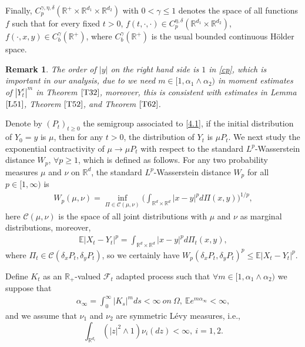 \documentclass[11pt,reqno]{amsart}
\newtheorem{remark}{\indent Remark}[section]
\numberwithin{equation}{section}
\begin{document}
Finally, $C^{\gamma, \eta, \delta}_p(\mathbb{R}^{+}\times\mathbb{R}^{d_{1}}\times\mathbb{R}^{d_{2}})$  with $0<\gamma\leq1$ denotes the space of all functions $f$ such that for every fixed $t>0$, $f(t,\cdot,\cdot)\in C^{\eta, \delta}_p(\mathbb{R}^{d_{1}}\times\mathbb{R}^{d_{2}})$, $f(\cdot,x,y)\in C_b^\gamma(\mathbb{R}^{+})$, where $C_b^\gamma(\mathbb{R}^{+})$ is the usual bounded continuous Hölder space.
\begin{remark}
The order of $|y|$ on the right hand side is $1$ in \eqref{cp}, which is important in our analysis, due to we need $m\in[1, \alpha_{1}\wedge\alpha_{2})$ in moment estimates of $|Y_{t}^{\varepsilon}|^{m}$ in Theorem $\ref{T32}$, moreover, this is consistent with estimates in Lemma $\ref{L51}$, Theorem $\ref{T52}$, and Theorem $\ref{T62}$.
\end{remark}

Denote by $(P_t)_{t\ge0}$ the semigroup associated to
\eqref{4.1}, if the initial distribution of $Y_0=y$ is $\mu$,
then for any $t>0$, the distribution of $Y_t$ is $\mu P_t$. We next study the exponential contractivity of $\mu\rightarrow\mu P_t$ with respect to the standard $L^p$-Wasserstein
distance $W_p$, $\forall p\geq1$, which is defined as follows. For any two probability measures $\mu$ and $\nu$ on $\mathbb{R}^d$,
the standard
$L^p$-Wasserstein distance
$W_p$ for all $p\in[1,\infty)$ is 
\begin{align*}
	W_p(\mu,\nu)=\inf_{\Pi\in\mathcal{C}(\mu,\nu)} \Big(\int
	_{\mathbb{R}^d\times\mathbb{R}^d} |x-y|^pd\Pi(x,y)
	\Big)^{1/p},
\end{align*}
here $\mathcal{C}(\mu,\nu)$ is the space of all joint distributions with $\mu$ and $\nu$ as marginal distributions,
moreover,
\begin{align*}
	\mathbb{E}|X_t-Y_t|^p=\int
	_{\mathbb{R}^d\times\mathbb{R}^d} |x-y|^pd\Pi_t(x,y),
\end{align*}
where $\Pi_t\in\mathcal{C}(\delta_xP_t,\delta_yP_t)$, so we certainly have $W_p(\delta_xP_t,\delta_yP_t)^p\leq\mathbb{E}|X_t-Y_t|^p$.



Define $K_{t}$ as an $\mathbb{R}_{+}$-valued $\mathcal{F}_{t}$ adapted process such that  $\forall m\in [1,\alpha_{1}\wedge\alpha_{2})$ we suppose that 
\begin{align}\label{kt}
	\alpha_{\infty}=\int_{0}^{\infty}|K_{s}|^mds<\infty\ on \ \Omega,\  \mathbb{E}e^{m\alpha_{\infty}}<\infty,
\end{align}
and we assume that $\nu_{1}$ and $\nu_{2}$ are symmetric L\'{e}vy measures, i.e., $$\int_{\mathbb{R}^{d_{i} }}(|z|^{2}\wedge 1)\nu_{i}(dz)<\infty, \ i=1,2.$$
\end{document}
